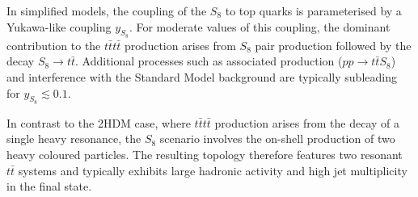 In simplified models, the coupling of the $S_{8}$ to top quarks is
parameterised by a Yukawa-like coupling \(y_{S_8}\).
For moderate values of this coupling, the dominant contribution to the
$t\bar{t}t\bar{t}$ production arises from $S_{8}$ pair production followed by the
decay \(S_8\rightarrow t\bar{t}\).
Additional processes such as associated production
(\(pp \rightarrow t\bar{t}S_8\)) and interference with the Standard Model
background are typically subleading for \(y_{S_8}\lesssim 0.1\).

In contrast to the 2HDM case, where $t\bar{t}t\bar{t}$ production arises from the
decay of a single heavy resonance, the $S_{8}$ scenario involves the
on-shell production of two heavy coloured particles.
The resulting topology therefore features two resonant
\(t\bar{t}\) systems and typically exhibits large hadronic activity and
high jet multiplicity in the final state.

